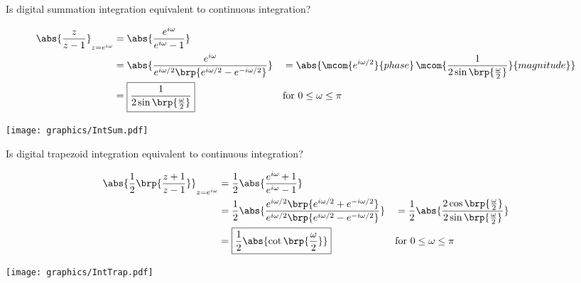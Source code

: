 
Is digital summation integration equivalent to continuous integration?

\begin{align*}
  \abs{\frac{z}{z-1}}_{z=e^{i\omega}}
    &= \abs{\frac{e^{i\omega}}{e^{i\omega}-1}}
  \\&= \abs{\frac{e^{i\omega}}{e^{i\omega/2}\brp{e^{i\omega/2}-e^{-i\omega/2}}}}
   &&= \abs{\mcom{e^{i\omega/2}}{phase}\,\mcom{\frac{1}{2\sin\brp{\frac{\omega}{2}}}}{magnitude}}
  \\&= \boxed{\frac{1}{2\sin\brp{\frac{\omega}{2}}}} 
    && \text{for $0\le\omega\le\pi$}
\end{align*}


\texttt{[image: graphics/IntSum.pdf]}


 
Is digital trapezoid integration equivalent to continuous integration?
 
\begin{align*}
  \abs{\frac{1}{2}\brp{\frac{z+1}{z-1}}}_{z=e^{i\omega}}
    &= \frac{1}{2}
       \abs{\frac{e^{i\omega}+1}{e^{i\omega}-1}}
  \\&= \frac{1}{2}
       \abs{\frac{e^{i\omega/2}\brp{e^{i\omega/2}+e^{-i\omega/2}}}
                 {e^{i\omega/2}\brp{e^{i\omega/2}-e^{-i\omega/2}}}
           }
   &&= \frac{1}{2}
       \abs{\frac{2\cos\brp{\frac{\omega}{2}}}
                 {2\sin\brp{\frac{\omega}{2}}}
           }
  \\&= \boxed{\frac{1}{2} \abs{\cot\brp{\frac{\omega}{2}}}}
    && \text{for $0\le\omega\le\pi$}
\end{align*}


\texttt{[image: graphics/IntTrap.pdf]}



